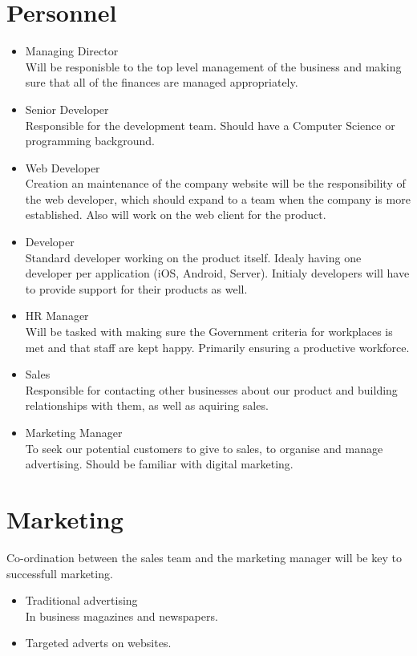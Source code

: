 \documentclass{article}
\begin{document}
\section{Personnel}
\begin{itemize}
\item Managing Director
\\Will be responisble to the top level management of the business and making sure that all of the finances are managed appropriately.

\item Senior Developer
\\Responsible for the development team.  Should have a Computer Science or programming background.

\item Web Developer
\\Creation an maintenance of the company website will be the responsibility of the web developer, which should expand to a team when the company is more established.  Also will work on the web client for the product.

\item Developer
\\Standard developer working on the product itself.  Idealy having one developer per application (iOS, Android, Server).  Initialy developers will have to provide support for their products as well.

\item HR Manager
\\Will be tasked with making sure the Government criteria for workplaces is met and that staff are kept happy.  Primarily ensuring a productive workforce.

\item Sales
\\Responsible for contacting other businesses about our product and building relationships with them, as well as aquiring sales.

\item Marketing Manager
\\To seek our potential customers to give to sales, to organise and manage advertising.  Should be familiar with digital marketing.
\end{itemize}



\section{Marketing}
Co-ordination between the sales team and the marketing manager will be key to successfull marketing.
\begin{itemize}
\item Traditional advertising
\\In business magazines and newspapers.

\item Targeted adverts on websites.

\end{itemize}
\end{document}
